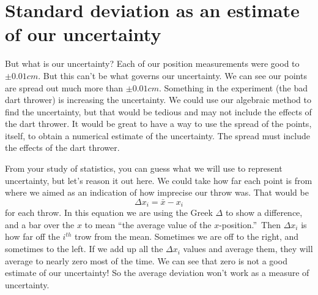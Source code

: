 \documentclass{book}%
\begin{document}
\section{Standard deviation as an estimate of our uncertainty}

But what is our uncertainty? Each of our position measurements were good to $%
\pm 0.01\unit{cm}.$ But this can't be what governs our uncertainty. We can
see our points are spread out much more than $\pm 0.01\unit{cm}.$ Something
in the experiment (the bad dart thrower) is increasing the uncertainty. We
could use our algebraic method to find the uncertainty, but that would be
tedious and may not include the effects of the dart thrower. It would be
great to have a way to use the spread of the points, itself, to obtain a
numerical estimate of the uncertainty. The spread must include the effects
of the dart thrower.

From your study of statistics, you can guess what we will use to represent
uncertainty, but let's reason it out here. We could take how far each point
is from where we aimed as an indication of how imprecise our throw was. That
would be 
\[
\Delta x_{i}=\bar{x}-x_{i} 
\]%
for each throw. In this equation we are using the Greek $\Delta $ to show a
difference, and a bar over the $x$ to mean \textquotedblleft the average
value of the $x$-position.\textquotedblright\ Then $\Delta x_{i}$ is how far
off the $i^{th}$ trow from the mean. Sometimes we are off to the right, and
sometimes to the left. If we add up all the $\Delta x_{i}$ values and
average them, they will average to nearly zero most of the time. We can see
that zero is not a good estimate of our uncertainty! So the average
deviation won't work as a measure of uncertainty.
\end{document}
